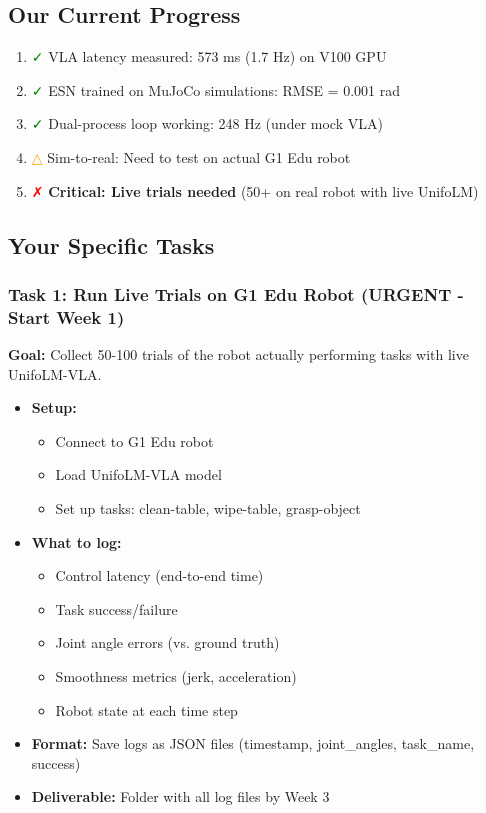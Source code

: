 \documentclass[11pt]{article}
\begin{document}
\subsection{Our Current Progress}
\begin{enumerate}
    \item \textcolor{green}{✓} VLA latency measured: 573 ms (1.7 Hz) on V100 GPU
    \item \textcolor{green}{✓} ESN trained on MuJoCo simulations: RMSE = 0.001 rad
    \item \textcolor{green}{✓} Dual-process loop working: 248 Hz (under mock VLA)
    \item \textcolor{orange}{△} Sim-to-real: Need to test on actual G1 Edu robot
    \item \textcolor{red}{✗} \textbf{Critical: Live trials needed} (50+ on real robot with live UnifoLM)
\end{enumerate}

\subsection{Your Specific Tasks}

\subsubsection{Task 1: Run Live Trials on G1 Edu Robot (URGENT - Start Week 1)}
\textbf{Goal:} Collect 50-100 trials of the robot actually performing tasks with live UnifoLM-VLA.

\begin{itemize}
    \item \textbf{Setup:}
    \begin{itemize}
        \item Connect to G1 Edu robot
        \item Load UnifoLM-VLA model
        \item Set up tasks: clean-table, wipe-table, grasp-object
    \end{itemize}
    \item \textbf{What to log:}
    \begin{itemize}
        \item Control latency (end-to-end time)
        \item Task success/failure
        \item Joint angle errors (vs. ground truth)
        \item Smoothness metrics (jerk, acceleration)
        \item Robot state at each time step
    \end{itemize}
    \item \textbf{Format:} Save logs as JSON files (timestamp, joint_angles, task_name, success)
    \item \textbf{Deliverable:} Folder with all log files by Week 3
\end{itemize}
\end{document}
